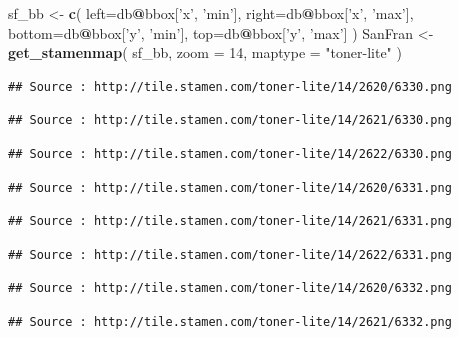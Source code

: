 \documentclass[
]{book}
\newenvironment{Shaded}{\begin{snugshade}}{\end{snugshade}}
\newcommand{\DataTypeTok}[1]{\textcolor[rgb]{0.13,0.29,0.53}{#1}}
\newcommand{\DecValTok}[1]{\textcolor[rgb]{0.00,0.00,0.81}{#1}}
\newcommand{\KeywordTok}[1]{\textcolor[rgb]{0.13,0.29,0.53}{\textbf{#1}}}
\newcommand{\NormalTok}[1]{#1}
\newcommand{\OperatorTok}[1]{\textcolor[rgb]{0.81,0.36,0.00}{\textbf{#1}}}
\newcommand{\StringTok}[1]{\textcolor[rgb]{0.31,0.60,0.02}{#1}}
\begin{document}
\begin{Shaded}
\begin{Highlighting}[]
\NormalTok{sf_bb <-}\StringTok{ }\KeywordTok{c}\NormalTok{(}
  \DataTypeTok{left=}\NormalTok{db}\OperatorTok{@}\NormalTok{bbox[}\StringTok{'x'}\NormalTok{, }\StringTok{'min'}\NormalTok{],}
  \DataTypeTok{right=}\NormalTok{db}\OperatorTok{@}\NormalTok{bbox[}\StringTok{'x'}\NormalTok{, }\StringTok{'max'}\NormalTok{],}
  \DataTypeTok{bottom=}\NormalTok{db}\OperatorTok{@}\NormalTok{bbox[}\StringTok{'y'}\NormalTok{, }\StringTok{'min'}\NormalTok{],}
  \DataTypeTok{top=}\NormalTok{db}\OperatorTok{@}\NormalTok{bbox[}\StringTok{'y'}\NormalTok{, }\StringTok{'max'}\NormalTok{]}
\NormalTok{  )}
\NormalTok{SanFran <-}\StringTok{ }\KeywordTok{get_stamenmap}\NormalTok{(}
\NormalTok{  sf_bb, }
  \DataTypeTok{zoom =} \DecValTok{14}\NormalTok{, }
  \DataTypeTok{maptype =} \StringTok{"toner-lite"}
\NormalTok{  )}
\end{Highlighting}
\end{Shaded}

\begin{verbatim}
## Source : http://tile.stamen.com/toner-lite/14/2620/6330.png
\end{verbatim}

\begin{verbatim}
## Source : http://tile.stamen.com/toner-lite/14/2621/6330.png
\end{verbatim}

\begin{verbatim}
## Source : http://tile.stamen.com/toner-lite/14/2622/6330.png
\end{verbatim}

\begin{verbatim}
## Source : http://tile.stamen.com/toner-lite/14/2620/6331.png
\end{verbatim}

\begin{verbatim}
## Source : http://tile.stamen.com/toner-lite/14/2621/6331.png
\end{verbatim}

\begin{verbatim}
## Source : http://tile.stamen.com/toner-lite/14/2622/6331.png
\end{verbatim}

\begin{verbatim}
## Source : http://tile.stamen.com/toner-lite/14/2620/6332.png
\end{verbatim}

\begin{verbatim}
## Source : http://tile.stamen.com/toner-lite/14/2621/6332.png
\end{verbatim}
\end{document}
